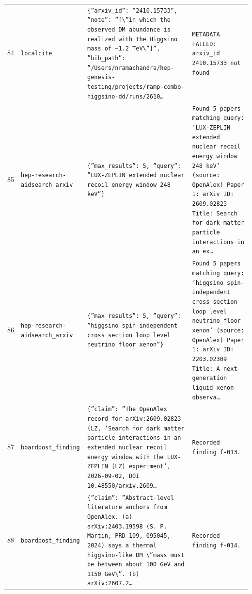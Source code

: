 \documentclass[11pt,a4paper]{article}
\begin{document}
\begin{longtable}{@{}p{}p{}p{}p{}@{}}
84 & \texttt{local}\newline\texttt{cite} & \texttt{\{''arxiv\_\allowbreak{}id'':\allowbreak{} ''2410.15733'',\allowbreak{} ''note'':\allowbreak{} ''[\textbackslash{}\allowbreak{}''in which the observed DM abundance is realized with the Higgsino mass of \textasciitilde{}\allowbreak{}1.2 TeV\textbackslash{}\allowbreak{}'']\allowbreak{}'',\allowbreak{} ''bib\_\allowbreak{}path'':\allowbreak{} ''/\allowbreak{}Users/\allowbreak{}nramachandra/\allowbreak{}hep-genesis-testing/\allowbreak{}projects/\allowbreak{}ramp-combo-higgsino-dd/\allowbreak{}runs/\allowbreak{}2610\ldots{}\allowbreak{}} & \texttt{METADATA FAILED:\allowbreak{} arxiv\_\allowbreak{}id 2410.15733 not found} \\
85 & \texttt{hep-research-aid}\newline\texttt{search\_\allowbreak{}arxiv} & \texttt{\{''max\_\allowbreak{}results'':\allowbreak{} 5,\allowbreak{} ''query'':\allowbreak{} ''LUX-ZEPLIN extended nuclear recoil energy window 248 keV''\}\allowbreak{}} & \texttt{Found 5 papers matching query:\allowbreak{} 'LUX-ZEPLIN extended nuclear recoil energy window 248 keV' (source:\allowbreak{} OpenAlex)\allowbreak{}  Paper 1:\allowbreak{} arXiv ID:\allowbreak{} 2609.02823 Title:\allowbreak{} Search for dark matter particle interactions in an ex\ldots{}\allowbreak{}} \\
86 & \texttt{hep-research-aid}\newline\texttt{search\_\allowbreak{}arxiv} & \texttt{\{''max\_\allowbreak{}results'':\allowbreak{} 5,\allowbreak{} ''query'':\allowbreak{} ''higgsino spin-independent cross section loop level neutrino floor xenon''\}\allowbreak{}} & \texttt{Found 5 papers matching query:\allowbreak{} 'higgsino spin-independent cross section loop level neutrino floor xenon' (source:\allowbreak{} OpenAlex)\allowbreak{}  Paper 1:\allowbreak{} arXiv ID:\allowbreak{} 2203.02309 Title:\allowbreak{} A next-generation liquid xenon observa\ldots{}\allowbreak{}} \\
87 & \texttt{board}\newline\texttt{post\_\allowbreak{}finding} & \texttt{\{''claim'':\allowbreak{} ''The OpenAlex record for arXiv:\allowbreak{}2609.02823 (LZ,\allowbreak{} 'Search for dark matter particle interactions in an extended nuclear recoil energy window with the LUX-ZEPLIN (LZ)\allowbreak{} experiment',\allowbreak{} 2026-09-02,\allowbreak{} DOI 10.48550/\allowbreak{}arxiv.2609\ldots{}\allowbreak{}} & \texttt{Recorded finding f-013.} \\
88 & \texttt{board}\newline\texttt{post\_\allowbreak{}finding} & \texttt{\{''claim'':\allowbreak{} ''Abstract-level literature anchors from OpenAlex. (a)\allowbreak{} arXiv:\allowbreak{}2403.19598 (S. P. Martin,\allowbreak{} PRD 109,\allowbreak{} 095045,\allowbreak{} 2024)\allowbreak{} says a thermal higgsino-like DM \textbackslash{}\allowbreak{}''mass must be between about 100 GeV and 1150 GeV\textbackslash{}\allowbreak{}''. (b)\allowbreak{} arXiv:\allowbreak{}2607.2\ldots{}\allowbreak{}} & \texttt{Recorded finding f-014.} \\

\end{longtable}
\end{document}
